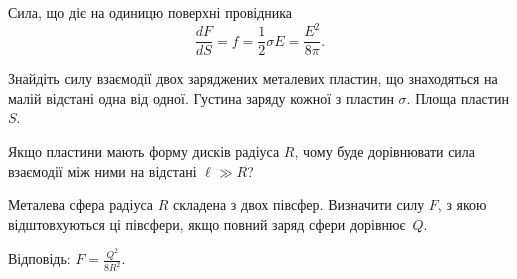 Сила, що діє на одиницю поверхні провідника
\begin{equation*}
	\frac{dF}{dS} = f = \frac12 \sigma E = \frac{E^2}{8\pi}.
\end{equation*}



\begin{problem}%
    Знайдіть силу взаємодії двох заряджених металевих пластин, що знаходяться на малій відстані
    одна від одної. Густина заряду кожної з пластин $\sigma$. Площа пластин $S$.

    Якщо пластини мають форму дисків радіуса $R$, чому буде дорівнювати сила взаємодії між ними на
    відстані $\ell \gg R$?
\end{problem}

\begin{problem}%
    Металева сфера радіуса $R$ складена з двох півсфер. Визначити силу $F$, з якою відштовхуються
    ці півсфери, якщо повний заряд сфери дорівнює~$Q$.

    Відповідь: $F= \frac{Q^2}{8R^2}$.
\end{problem}

